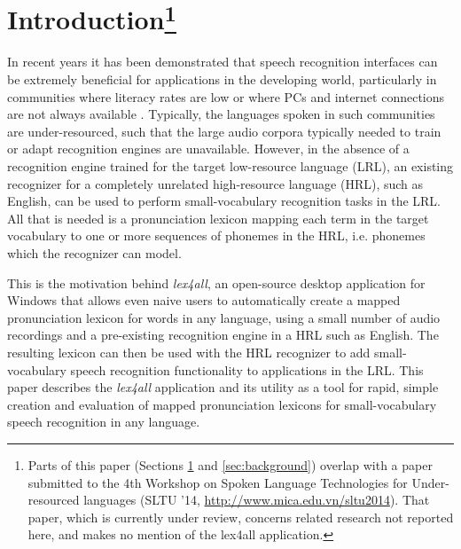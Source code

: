 \documentclass[11pt]{article}
\begin{document}
\section{Introduction\footnote{Parts of this paper (Sections \ref{sec:intro} and \ref{sec:background}) overlap with a paper submitted to the 4th Workshop on Spoken Language Technologies for Under-resourced languages (SLTU '14, \url{http://www.mica.edu.vn/sltu2014}). That paper, which is currently under review, concerns related research not reported here, and makes no mention of the lex4all application.}}
\label{sec:intro}

In recent years it has been demonstrated that speech recognition interfaces can be extremely beneficial for applications in the developing world, particularly in communities where literacy rates are low or where PCs and internet connections are not always available \cite{case4st4d,bali13,Sherwani09}. 
Typically, the languages spoken in such communities are under-resourced, such that the large audio corpora typically needed to train or adapt recognition engines are unavailable.
However, in the absence of a recognition engine trained for the target low-resource language (LRL), an existing recognizer for a completely unrelated high-resource language (HRL), such as English, can be used to perform small-vocabulary recognition tasks in the LRL. 
All that is needed is a pronunciation lexicon mapping each term in the target vocabulary to one or more sequences of phonemes in the HRL, i.e. phonemes which the recognizer can model. 

This is the motivation behind \textit{lex4all}, an open-source desktop application for Windows that allows even naive users to automatically create a mapped pronunciation lexicon for words in any language, using a small number of audio recordings and a pre-existing recognition engine in a HRL such as English. The resulting lexicon can then be used with the HRL recognizer to add small-vocabulary speech recognition functionality to applications in the LRL. This paper describes the \textit{lex4all} application and its utility as a tool for rapid, simple creation and evaluation of mapped pronunciation lexicons for small-vocabulary speech recognition in any language.
\end{document}
